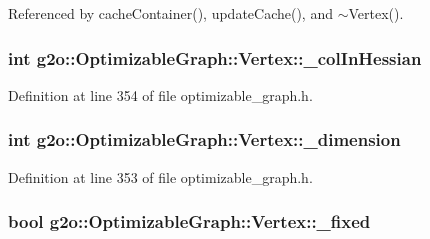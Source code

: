 Referenced by cache\+Container(), update\+Cache(), and $\sim$\+Vertex().

\subsubsection[{\texorpdfstring{\+\_\+col\+In\+Hessian}{_colInHessian}}]{\setlength{\rightskip}{0pt plus 5cm}int g2o\+::\+Optimizable\+Graph\+::\+Vertex\+::\+\_\+col\+In\+Hessian\hspace{0.3cm}{\ttfamily [protected]}}\hypertarget{classg2o_1_1OptimizableGraph_1_1Vertex_add1f5a0236a175784a824524244f7085}{}\label{classg2o_1_1OptimizableGraph_1_1Vertex_add1f5a0236a175784a824524244f7085}


Definition at line 354 of file optimizable\+\_\+graph.\+h.

\subsubsection[{\texorpdfstring{\+\_\+dimension}{_dimension}}]{\setlength{\rightskip}{0pt plus 5cm}int g2o\+::\+Optimizable\+Graph\+::\+Vertex\+::\+\_\+dimension\hspace{0.3cm}{\ttfamily [protected]}}\hypertarget{classg2o_1_1OptimizableGraph_1_1Vertex_ab053ffd8851cd3b0f61576ffd349d68e}{}\label{classg2o_1_1OptimizableGraph_1_1Vertex_ab053ffd8851cd3b0f61576ffd349d68e}


Definition at line 353 of file optimizable\+\_\+graph.\+h.

\subsubsection[{\texorpdfstring{\+\_\+fixed}{_fixed}}]{\setlength{\rightskip}{0pt plus 5cm}bool g2o\+::\+Optimizable\+Graph\+::\+Vertex\+::\+\_\+fixed\hspace{0.3cm}{\ttfamily [protected]}}\hypertarget{classg2o_1_1OptimizableGraph_1_1Vertex_af98461471e6b58664a9fc4bba9340501}{}\label{classg2o_1_1OptimizableGraph_1_1Vertex_af98461471e6b58664a9fc4bba9340501}


